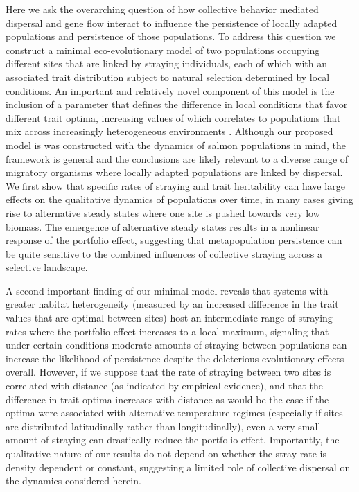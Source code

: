 \documentclass[twocolumn,preprintnumbers,amsmath,amssymb,superscriptaddress]{revtex4}
\begin{document}
Here we ask the overarching question of how collective behavior mediated dispersal and gene flow interact to influence the persistence of locally adapted populations and persistence of those populations.
To address this question we construct a minimal eco-evolutionary model of two populations occupying different sites that are linked by straying individuals, each of which with an associated trait distribution subject to natural selection determined by local conditions.
An important and relatively novel component of this model is the inclusion of a parameter that defines the difference in local conditions that favor different trait optima, increasing values of which correlates to populations that mix across increasingly heterogeneous environments \cite[though see ]{Berdahl:2015kv}.
Although our proposed model is was constructed with the dynamics of salmon populations in mind, the framework is general and the conclusions are likely relevant to a diverse range of migratory organisms where locally adapted populations are linked by dispersal.
We first show that specific rates of straying and trait heritability can have large effects on the qualitative dynamics of populations over time, in many cases giving rise to alternative steady states where one site is pushed towards very low biomass.
The emergence of alternative steady states results in a nonlinear response of the portfolio effect, suggesting that metapopulation persistence can be quite sensitive to the combined influences of collective straying across a selective landscape.


A second important finding of our minimal model reveals that systems with greater habitat heterogeneity (measured by an increased difference in the trait values that are optimal between sites) host an intermediate range of straying rates where the portfolio effect increases to a local maximum, signaling that under certain conditions moderate amounts of straying between populations can increase the likelihood of persistence despite the deleterious evolutionary effects overall.
However, if we suppose that the rate of straying between two sites is correlated with distance (as indicated by empirical evidence), and that the difference in trait optima increases with distance as would be the case if the optima were associated with alternative temperature regimes (especially if sites are distributed latitudinally rather than longitudinally), even a very small amount of straying can drastically reduce the portfolio effect.
Importantly, the qualitative nature of our results do not depend on whether the stray rate is density dependent or constant, suggesting a limited role of collective dispersal on the dynamics considered herein.
\end{document}
